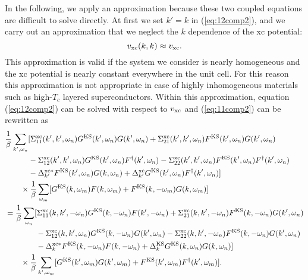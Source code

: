 %
In the following, we apply an approximation because these two coupled equations are difficult 
to solve directly. At first we set $k' = k$ in (\ref{eq:12comp2}), and we carry out an 
approximation that we neglect the $k$ dependence of the xc potential:
%
\begin{equation}
	v_{\rm xc}(k,k) \approx v_{\rm xc}.
	\label{eq:vxcapprox}
\end{equation}
%
This approximation is valid if the system we consider is nearly homogeneous and the xc potential is
nearly constant everywhere in the unit cell. For this reason this approximation is not appropriate
in case of highly inhomogeneous materials such as high-$T_c$ layered superconductors.
Within this approximation, equation (\ref{eq:12comp2}) can be solved with respect to $v_{\rm xc}$
and (\ref{eq:11comp2}) can be rewritten as
%
\begin{equation}
\begin{split}
	& \frac{1}{\beta} \sum_{k',\omega_n} [\Sigma^{\rm xc}_{11}(k',k',\omega_n)
	  G^{\rm KS}(k',\omega_n)G(k',\omega_n) + \Sigma^{\rm xc}_{21}(k',k',\omega_n)
	  F^{\rm KS}(k',\omega_n)G(k',\omega_n) \\
  	&\quad \quad \quad - \Sigma^{\rm xc}_{12}(k',k',\omega_n)G^{\rm KS}(k',\omega_n)F^{\dag}(k',\omega_n)
	- \Sigma^{\rm xc}_{22}(k',k',\omega_n)F^{\rm KS}(k',\omega_n)F^{\dag}(k',\omega_n) \\
	&\quad \quad \quad -\Delta^{\rm xc \ast}_{k'}F^{\rm KS}(k',\omega_n)G(k,\omega_n) + 
	\Delta^{\rm xc}_{k'}G^{\rm KS}(k',\omega_n)F^{\dag}(k',\omega_n)] \\
	&\quad \quad \times \frac{1}{\beta}\sum_{\omega_m} [G^{\rm KS}(k,\omega_m)F(k,\omega_m) + 
	F^{\rm KS}(k,-\omega_m)G(k,\omega_m)] \\
	& = 
	 \frac{1}{\beta} \sum_{\omega_n} [\Sigma^{\rm xc}_{11}(k,k',-\omega_n)
	  G^{\rm KS}(k,-\omega_n)F(k',-\omega_n) + \Sigma^{\rm xc}_{21}(k,k',-\omega_n)
	  F^{\rm KS}(k,-\omega_n)G(k',\omega_n) \\
  	&\quad \quad \quad \quad- \Sigma^{\rm xc}_{12}(k,k',\omega_n)G^{\rm KS}(k,-\omega_n)G(k',\omega_n)
	- \Sigma^{\rm xc}_{22}(k,k',-\omega_n)F^{\rm KS}(k,-\omega_n)G(k',\omega_n) \\
	&\quad \quad \quad \quad-\Delta^{\rm xc \ast}_{k}F^{\rm KS}(k,-\omega_n)F(k,-\omega_n)
	+ \Delta^{\rm KS}_{k}G^{\rm KS}(k,\omega_n)G(k,\omega_n) ] \\
	& \quad \quad \times 
	\frac{1}{\beta} \sum_{k',\omega_m}[ G^{\rm KS}(k',\omega_m)G(k',\omega_m) + 
	F^{\rm KS}(k', \omega_m)F^{\dag}(k',\omega_m)].
	\label{eq:vxcvanish}
\end{split}
\end{equation}
